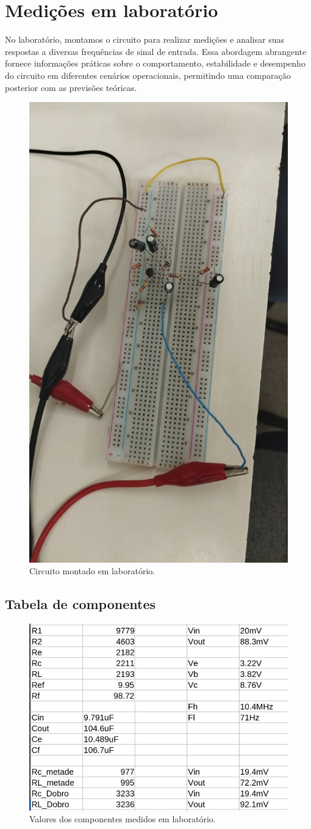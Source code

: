 \section{Medições em laboratório}

No laboratório, montamos o circuito para realizar medições e analisar suas respostas a diversas frequências de sinal de entrada. Essa abordagem abrangente fornece informações práticas sobre o comportamento, estabilidade e desempenho do circuito em diferentes cenários operacionais, permitindo uma comparação posterior com as previsões teóricas.

\begin{figure}[H]
    \centering
    \includegraphics[width=0.5\columnwidth]{Images/circuito_real.jpeg}
    \caption{Circuito montado em laboratório.}
\end{figure}

\subsection{Tabela de componentes}

\begin{figure}[H]
    \centering
    \includegraphics[width=0.5\columnwidth]{Images/componentes_reais.png}
    \caption{Valores dos componentes medidos em laboratório.}
\end{figure}

